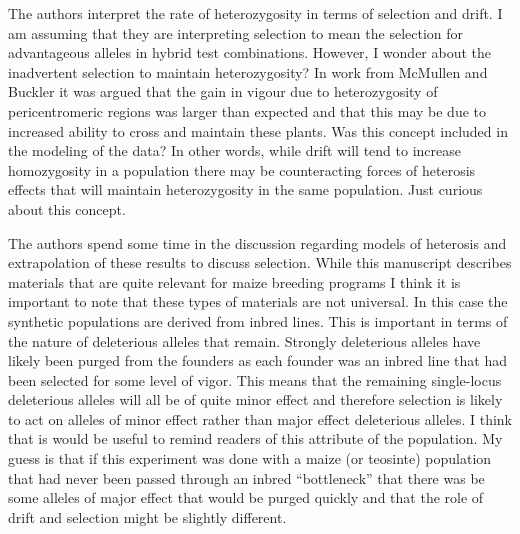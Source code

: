 \documentclass[onecolumn,oneside,letterpaper]{article}
\begin{document}
The authors interpret the rate of heterozygosity in terms of selection and drift.  I am assuming that they are interpreting selection to mean the selection for advantageous alleles in hybrid test combinations.  However, I wonder about the inadvertent selection to maintain heterozygosity?  In work from McMullen and Buckler it was argued that the gain in vigour due to heterozygosity of pericentromeric regions was larger than expected and that this may be due to increased ability to cross and maintain these plants.  Was this concept included in the modeling of the data?  In other words, while drift will tend to increase homozygosity in a population there may be counteracting forces of heterosis effects that will maintain heterozygosity in the same population.  Just curious about this concept.


The authors spend some time in the discussion regarding models of heterosis and 
extrapolation of these results to discuss selection.  While this manuscript 
describes materials that are quite relevant for maize breeding programs I think 
it is important to note that these types of materials are not universal.  In 
this case the synthetic populations are derived from inbred lines.  This is 
important in terms of the nature of deleterious alleles that remain.  Strongly 
deleterious alleles have likely been purged from the founders as each founder 
was an inbred line that had been selected for some level of vigor.  This means 
that the remaining single-locus deleterious alleles will all be of quite minor 
effect and therefore selection is likely to act on alleles of minor effect 
rather than major effect deleterious alleles.  I think that is would be useful 
to remind readers of this attribute of the population.  My guess is that if this 
experiment was done with a maize (or teosinte) population that had never been 
passed through an inbred ``bottleneck'' that there was be some alleles of major 
effect that would be purged quickly and that the role of drift and selection 
might be slightly different.

\end{document}
